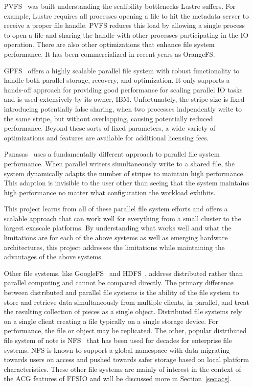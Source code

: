 \documentclass[conference]{IEEEtran} \pdfpagewidth=8.5in
\begin{document}
PVFS~\cite{carns:pvfs} was built understanding the scalibility bottlenecks
Lustre suffers. For example, Lustre requires all processes opening a file to
hit the metadata server to receive a proper file handle. PVFS reduces this load
by allowing a single process to open a file and sharing the handle with other
processes participating in the IO operation. There are also other optimizations
that enhance file system performance. It has been commercialized in recent
years as OrangeFS.

GPFS~\cite{schmuck:gpfs} offers a highly scalable parallel file system with
robust functionality to handle both parallel storage, recovery, and
optimization. It only supports a hands-off approach for providing good
performance for scaling parallel IO tasks and is used extensively by its owner,
IBM. Unfortunately, the stripe size is fixed introducing potentially false
sharing, when two processes indpendently write to the same stripe, but without
overlapping, causing potentially reduced performance. Beyond these sorts of
fixed parameters, a wide variety of optimizations and features are available
for additional licensing fees.

Panasas~\cite{panasas:architecture} uses a fundamentally different approach to
parallel file system performance. When parallel writers simultaneously write to
a shared file, the system dynamically adapts the number of stripes to maintain
high performance. This adaption is invisible to the user other than seeing that
the system maintains high performance no matter what configuration the workload
exhibits.

This project learns from all of these parallel file system efforts and offers a
scalable approach that can work well for everything from a small cluster to the
largest exascale platforms. By understanding what works well and what the
limitations are for each of the above systems as well as emerging hardware
architectures, this project addresses the limitations while maintaining the
advantages of the above systems.

Other file systems, like GoogleFS~\cite{ghemawat:googlefs} and
HDFS~\cite{Shvachko:2010:hdfs}, address distributed rather than parallel
computing and cannot be compared directly. The primary difference between
distributed and parallel file systems is the ability of the file system to
store and retrieve data simultaneously from multiple clients, in parallel, and
treat the resulting collection of pieces as a single object.  Distributed file
systems rely on a single client creating a file typically on a single storage
device. For performance, the file or object may be replicated.  The other,
popular distributed file system of note is NFS~\cite{powlowski:1994:nfs3} that
has been used for decades for enterprise file systems.  NFS is known to support
a global namespace with data migrating towards users on access and pushed
towards safer storage based on local platform characteristics. These other file
systems are mainly of interest in the context of the ACG features of FFSIO and
will be discussed more in Section~\ref{sec:acg}.
\end{document}
